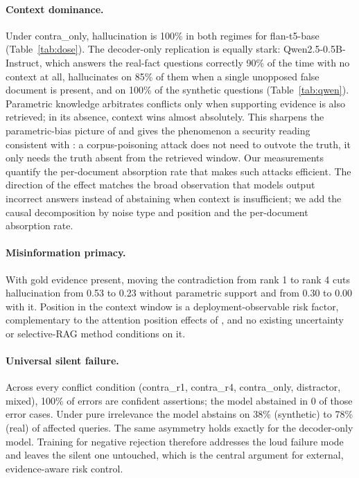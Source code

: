 \documentclass[11pt]{article}
\begin{document}
\paragraph{Context dominance.}
Under contra\_only, hallucination is 100\% in both regimes for
flan-t5-base (Table~\ref{tab:dose}). The decoder-only replication is
equally stark: Qwen2.5-0.5B-Instruct, which answers the real-fact
questions correctly 90\% of the time with no context at all,
hallucinates on 85\% of them when a single unopposed false document is
present, and on 100\% of the synthetic questions
(Table~\ref{tab:qwen}). Parametric knowledge arbitrates conflicts only
when supporting evidence is also retrieved; in its absence, context
wins almost absolutely. This sharpens the parametric-bias picture of
\citet{kortukov2024conflicts} and gives the phenomenon a security
reading consistent with \citet{zou2025poisonedrag}: a corpus-poisoning
attack does not need to outvote the truth, it only needs the truth
absent from the retrieved window. Our measurements quantify the
per-document absorption rate that makes such attacks efficient. The
direction of the effect matches the broad observation that models output
incorrect answers instead of abstaining when context is insufficient; we add the
causal decomposition by noise type and position and the per-document
absorption rate.

\paragraph{Misinformation primacy.}
With gold evidence present, moving the contradiction from rank 1 to
rank 4 cuts hallucination from 0.53 to 0.23 without parametric support
and from 0.30 to 0.00 with it. Position in the context window is a
deployment-observable risk factor, complementary to the attention
position effects of \citet{liu2024lost}, and no existing uncertainty
or selective-RAG method conditions on it.

\paragraph{Universal silent failure.}
Across every conflict condition (contra\_r1, contra\_r4, contra\_only,
distractor, mixed), 100\% of errors are confident assertions; the model
abstained in 0 of those error cases. Under pure irrelevance the model
abstains on 38\% (synthetic) to 78\% (real) of affected queries. The
same asymmetry holds exactly for the decoder-only model. Training for
negative rejection \citep{chen2023rgb,zhang2024rtuning} therefore
addresses the loud failure mode and leaves the silent one untouched,
which is the central argument for external, evidence-aware risk
control.
\end{document}
